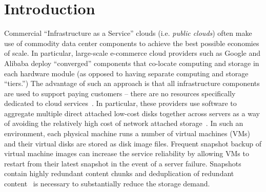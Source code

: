 \section{Introduction}

Commercial ``Infrastructure as a Service'' clouds (i.e. {\em public
clouds}) often make use of commodity data center components to achieve the
best possible economies of scale.  In particular, large-scale e-commerce cloud
providers such as Google and Alibaba deploy ``converged'' components that
co-locate computing and storage in each hardware module (as opposed to having
separate computing and storage ``tiers.'')  The advantage of such an approach
is that all infrastructure components are used to support paying customers --
there are no resources specifically dedicated to cloud services~\cite{NutanixPaper}.
In particular, these providers use software to
aggregate multiple direct attached low-cost disks together across
servers as a way of avoiding the relatively high cost of network attached 
storage~\cite{googlefs03,hdfs10}.
In such an environment,
each physical machine runs a number of virtual machines (VMs)
and their virtual disks are stored as disk image files.
Frequent snapshot backup of virtual machine images can
increase the service reliability by allowing VMs to restart from their latest
snapshot in the event of a server failure. Snapshots contain highly redundant content chunks and 
deduplication of redundant 
content~\cite{venti02,bottleneck08} is necessary to substantially reduce the
storage demand. 


